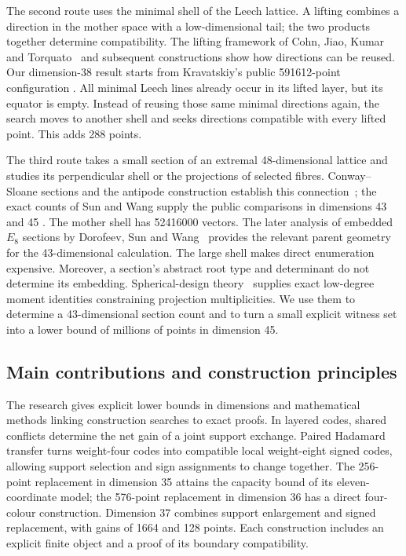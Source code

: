 The second route uses the minimal shell of the Leech lattice. A lifting
combines a direction in the mother space with a low-dimensional tail;
the two products together determine compatibility. The lifting framework
of Cohn, Jiao, Kumar and Torquato~\cite[Theorem 7.5]{cjkt} and subsequent
constructions show how directions can be reused. Our dimension-38 result
starts from Kravatskiy's public 591612-point configuration
\cite{kissingnumbers}. All minimal Leech lines already occur in its
lifted layer, but its equator is empty. Instead of reusing those same
minimal directions again, the search moves to another shell and seeks
directions compatible with every lifted point. This adds 288 points.

The third route takes a small section of an extremal 48-dimensional
lattice and studies its perpendicular shell or the projections of selected
fibres. Conway--Sloane sections and the antipode construction establish
this connection~\cite{laminated,antipode}; the exact counts of Sun and Wang
supply the public comparisons in dimensions 43 and 45
\cite{sunwang-sections,crosssections}. The mother shell has 52416000
vectors. The later analysis of embedded $E_8$ sections by
Dorofeev, Sun and Wang~\cite{dorofeev} provides the relevant parent
geometry for the 43-dimensional calculation. The large shell makes
direct enumeration expensive. Moreover, a section's
abstract root type and determinant do not determine its embedding.
Spherical-design theory~\cite{dgs,nebe-designs} supplies exact low-degree
moment identities constraining projection multiplicities. We use them
to determine a 43-dimensional section count and to turn a small explicit
witness set into a lower bound of millions of points in dimension 45.

\subsection{Main contributions and construction principles}

The research gives explicit lower bounds in \ResultCount{} dimensions and
mathematical methods linking construction searches to exact proofs.
In layered codes, shared conflicts determine the net gain of a joint
support exchange. Paired Hadamard transfer turns weight-four codes into
compatible local weight-eight signed codes, allowing support selection
and sign assignments to change together. The 256-point replacement in
dimension 35 attains the capacity bound of its eleven-coordinate model;
the 576-point replacement in dimension 36 has a direct four-colour
construction. Dimension 37 combines support enlargement and signed
replacement, with gains of 1664 and 128 points. Each construction includes
an explicit finite object and a proof of its boundary compatibility.

